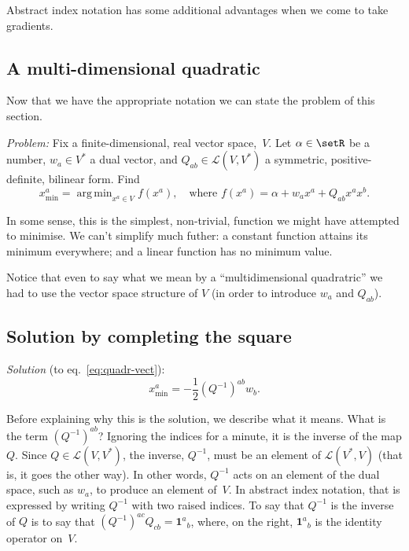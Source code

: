 \documentclass[10pt, a4paper]{article}
\newcommand{\id}{\mathbold{1}}
\DeclareMathOperator*{\argmin}{arg\,min}
\begin{document}
Abstract index notation has some additional advantages when we come to
take gradients.

\subsection{A multi-dimensional quadratic}

Now that we have the appropriate notation we can state the problem of
this section.

\emph{Problem:} Fix a finite-dimensional, real vector space,~$V$. Let
$\alpha\in\setR$ be a number, $w_a\in V^*$ a dual vector, and
$Q_{ab} \in \mathcal{L}(V,V^*)$ a symmetric, positive-definite, bilinear
form. Find 
\begin{equation}
x^a_\text{min} = \argmin_{x^a\in V} f(x^a),\quad\text{where $f(x^a) = \alpha + w_ax^a + Q_{ab}x^ax^b$}.
\label{eq:quadr-vect}
\end{equation}

In some sense, this is the simplest, non-trivial, function we might
have attempted to minimise. We can't simplify much futher: a constant
function attains its minimum everywhere; and a linear function has no
minimum value.

Notice that even to say what we mean by a “multidimensional
quadratric” we had to use the vector space structure of $V$ (in order
to introduce $w_a$ and $Q_{ab}$).

\subsection{Solution by completing the square}

\emph{Solution} (to eq.~\eqref{eq:quadr-vect}):
\begin{equation}
  x^a_\text{min} = -\frac{1}{2} {(Q^{-1})}^{ab}w_b.
\label{eq:sol-quadr-vect}
\end{equation}

Before explaining why this is the solution, we describe what it
means. What is the term ${(Q^{-1})}^{ab}$? Ignoring the indices for a
minute, it is the inverse of the map $Q$. Since
$Q\in\mathcal{L}(V, V^*)$, the inverse, $Q^{-1}$, must be an element of
$\mathcal{L}(V^*, V)$ (that is, it goes the other way). In other words,
$Q^{-1}$ acts on an element of the dual space, such as $w_a$, to
produce an element of~$V$. In abstract index notation, that is
expressed by writing $Q^{-1}$ with two raised indices. To say that
$Q^{-1}$ is the inverse of $Q$ is to say that
${(Q^{-1})}^{ac}Q_{cb} = \id^a{}_b$, where, on the right, $\id^a{}_b$
is the identity operator on~$V$.
\end{document}

